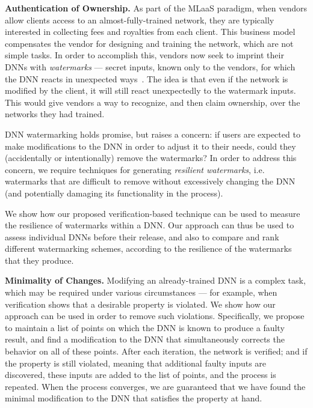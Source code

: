 \documentclass{easychair}
\begin{document}
\medskip\noindent
\textbf{Authentication of Ownership.}
As part of the MLaaS paradigm, when vendors allow clients access to an almost-fully-trained network,
they are typically interested in collecting fees and royalties from
each client. This business model compensates the vendor for designing
and training the network, which are not simple tasks. In order to
accomplish this, vendors now seek to imprint their DNNs with
\emph{watermarks} --- secret inputs, known only to the vendors, for which the DNN reacts in
unexpected ways~\cite{AdBaPiKeWatermarking}. The idea is that even if the network is modified by
the client, it will still react unexpectedly to the watermark inputs. This would give vendors a way to
recognize, and then claim ownership, over the networks they had
trained.

DNN watermarking holds promise, but raises a concern: if users are
expected to make modifications to the DNN in order to adjust it to
their needs, could they (accidentally or intentionally) remove the
watermarks? In order to address this concern, we require techniques
for generating \emph{resilient watermarks}, i.e. watermarks that are
difficult to remove without excessively changing the DNN (and
potentially damaging its functionality in the process).

We show how our proposed verification-based technique can be used to
measure the resilience of watermarks within a DNN. Our approach can
thus be used to assess individual DNNs before their release, and also to compare and rank different watermarking schemes, according to
the resilience of the watermarks that they produce.

\medskip\noindent \textbf{Minimality of Changes.}
Modifying an already-trained DNN is a complex task, which may be
required under various circumstances --- for example, when
verification shows that a desirable property is violated. 
We show how our approach can be used in order to remove such
violations. Specifically, we propose to maintain a list of points on which
the DNN is known to produce a faulty result, and find a modification
to the DNN that simultaneously corrects the behavior on all of these
points. After each iteration, the network is verified; and if
the property is still violated, meaning that additional faulty inputs
are discovered, these inputs are added to the list of
points, and the process is repeated. When the process converges, we
are guaranteed that we have found the minimal modification to the DNN
that satisfies the property at hand.

\medskip
\end{document}

